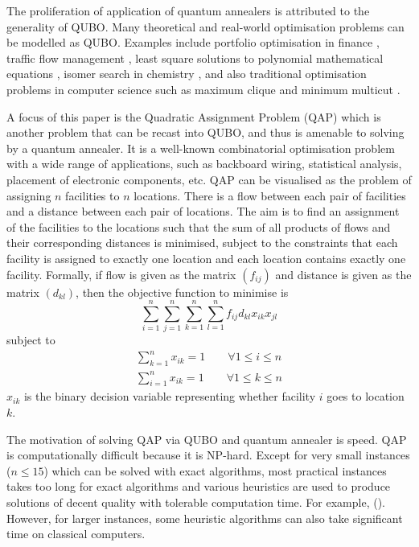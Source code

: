 \documentclass[conference]{IEEEtran}
\begin{document}
The proliferation of application of quantum annealers is attributed to the generality of QUBO. Many theoretical and real-world optimisation problems can be modelled as QUBO. Examples include portfolio optimisation in finance \cite{Rosenberg:2016}, traffic flow management \cite{Neukart:2017}, least square solutions to polynomial mathematical equations \cite{Chang:2019}, isomer search in chemistry \cite{Terry:2020}, and also traditional optimisation problems in computer science such as maximum clique \cite{Naghsh:2019} and minimum multicut \cite{Cruz-Santos:2019}.

A focus of this paper is the Quadratic Assignment Problem (QAP) which is another problem that can be recast into QUBO, and thus is amenable to solving by a quantum annealer. It is a well-known combinatorial optimisation problem with a wide range of applications, such as backboard wiring, statistical analysis, placement of electronic components, etc.
QAP can be visualised as the problem of assigning $n$ facilities to $n$ locations. There is a flow between each pair of facilities and a distance between each pair of locations. The aim is to find an assignment of the facilities to the locations such that the sum of all products of flows and their corresponding distances is minimised, subject to the constraints that each facility is assigned to exactly one location and each location contains exactly one facility. Formally, if flow is given as the matrix $(f_{ij})$ and distance is given as the matrix $(d_{kl})$, then the objective function to minimise is \[\sum_{i=1}^{n}\sum_{j=1}^{n}\sum_{k=1}^{n}\sum_{l=1}^{n}f_{ij}d_{kl}x_{ik}x_{jl}\] subject to \begin{align}
\sum_{k=1}^{n}x_{ik}=1 \qquad \forall 1\leq i \leq n \label{ct1}\\
\sum_{i=1}^{n}x_{ik}=1 \qquad \forall 1\leq k \leq n \label{ct2}
\end{align}
$x_{ik}$ is the binary decision variable representing whether facility $i$ goes to location $k$.

The motivation of solving QAP via QUBO and quantum annealer is speed. QAP is computationally difficult because it is NP-hard. Except for very small instances ($n\le15$) which can be solved with exact algorithms, most practical instances takes too long for exact algorithms and various heuristics are used to produce solutions of decent quality with tolerable computation time. For example, (). However, for larger instances, some heuristic algorithms can also take significant time on classical computers. 
\end{document}

